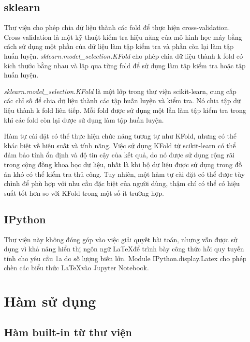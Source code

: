 \documentclass[]{article}
\begin{document}
\subsection{sklearn}
Thư viện cho phép chia dữ liệu thành các fold để thực hiện cross-validation. Cross-validation là một kỹ thuật kiểm tra hiệu năng của mô hình học máy bằng cách sử dụng một phần của dữ liệu làm tập kiểm tra và phần còn lại làm tập huấn luyện. \textit{sklearn.model\_selection.KFold} cho phép chia dữ liệu thành k fold có kích thước bằng nhau và lặp qua từng fold để sử dụng làm tập kiểm tra hoặc tập huấn luyện.

\textit{sklearn.model\_selection.KFold} là một lớp trong thư viện scikit-learn, cung cấp các chỉ số để chia dữ liệu thành các tập huấn luyện và kiểm tra. Nó chia tập dữ liệu thành k fold liên tiếp. Mỗi fold được sử dụng một lần làm tập kiểm tra trong khi các fold còn lại được sử dụng làm tập huấn luyện.

Hàm tự cài đặt có thể thực hiện chức năng tương tự như KFold, nhưng có thể khác biệt về hiệu suất và tính năng. Việc sử dụng KFold từ scikit-learn có thể đảm bảo tính ổn định và độ tin cậy của kết quả, do nó được sử dụng rộng rãi trong cộng đồng khoa học dữ liệu, nhất là khi bộ dữ liệu được sử dụng trong đồ án khó có thể kiểm tra thủ công. Tuy nhiên, một hàm tự cài đặt có thể được tùy chỉnh để phù hợp với nhu cầu đặc biệt của người dùng, thậm chí có thể có hiệu suất tốt hơn so với KFold trong một số ít trường hợp.

\subsection{IPython}
Thư viện này không đóng góp vào việc giải quyết bài toán, nhưng vẫn được sử dụng vì khả năng hiển thị ngôn ngữ \LaTeX \space để trình bày công thức hồi quy tuyến tính cho yêu cầu 1a do số lượng biến lớn. Module IPython.display.Latex cho phép chèn các biểu thức \LaTeX \space vào Jupyter Notebook.

\section{Hàm sử dụng}
\subsection{Hàm built-in từ thư viện}
\end{document}
